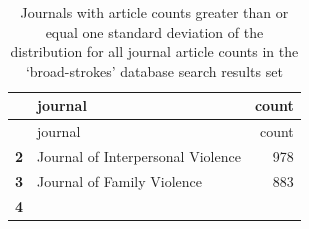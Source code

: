 \documentclass[]{tufte-handout}
\begin{document}
\begin{longtable}[]{@{}rlr@{}}
\caption{Journals with article counts greater than or equal one standard
deviation of the distribution for all journal article counts in the
`broad-strokes' database search results set}\tabularnewline
\toprule
\begin{minipage}[b]{0.11\columnwidth}\raggedleft\strut
~\strut
\end{minipage} & \begin{minipage}[b]{0.56\columnwidth}\raggedright\strut
journal\strut
\end{minipage} & \begin{minipage}[b]{0.09\columnwidth}\raggedleft\strut
count\strut
\end{minipage}\tabularnewline
\midrule
\endfirsthead
\toprule
\begin{minipage}[b]{0.11\columnwidth}\raggedleft\strut
~\strut
\end{minipage} & \begin{minipage}[b]{0.56\columnwidth}\raggedright\strut
journal\strut
\end{minipage} & \begin{minipage}[b]{0.09\columnwidth}\raggedleft\strut
count\strut
\end{minipage}\tabularnewline
\midrule
\endhead
\begin{minipage}[t]{0.11\columnwidth}\raggedleft\strut
\textbf{2}\strut
\end{minipage} & \begin{minipage}[t]{0.56\columnwidth}\raggedright\strut
Journal of Interpersonal Violence\strut
\end{minipage} & \begin{minipage}[t]{0.09\columnwidth}\raggedleft\strut
978\strut
\end{minipage}\tabularnewline
\begin{minipage}[t]{0.11\columnwidth}\raggedleft\strut
\textbf{3}\strut
\end{minipage} & \begin{minipage}[t]{0.56\columnwidth}\raggedright\strut
Journal of Family Violence\strut
\end{minipage} & \begin{minipage}[t]{0.09\columnwidth}\raggedleft\strut
883\strut
\end{minipage}\tabularnewline
\begin{minipage}[t]{0.11\columnwidth}\raggedleft\strut
\textbf{4}\strut
\end{minipage} & \begin{minipage}[t]{0.56\columnwidth}\raggedright\strut

\end{minipage}
\end{longtable}
\end{document}
